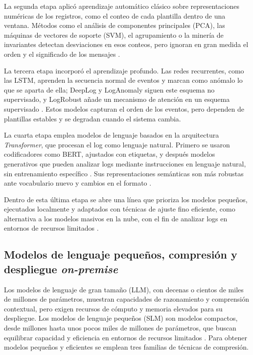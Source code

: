 La segunda etapa aplicó aprendizaje automático clásico sobre representaciones numéricas de los registros, como el conteo de cada plantilla dentro de una ventana. Métodos como el análisis de componentes principales (PCA), las máquinas de vectores de soporte (SVM), el agrupamiento o la minería de invariantes detectan desviaciones en esos conteos, pero ignoran en gran medida el orden y el significado de los mensajes \cite{he2021_survey}.

La tercera etapa incorporó el aprendizaje profundo. Las redes recurrentes, como las LSTM, aprenden la secuencia normal de eventos y marcan como anómalo lo que se aparta de ella; DeepLog y LogAnomaly siguen este esquema no supervisado, y LogRobust añade un mecanismo de atención en un esquema supervisado \cite{jiang2021_aiops}. Estos modelos capturan el orden de los eventos, pero dependen de plantillas estables y se degradan cuando el sistema cambia.

La cuarta etapa emplea modelos de lenguaje basados en la arquitectura \textit{Transformer}, que procesan el log como lenguaje natural. Primero se usaron codificadores como BERT, ajustados con etiquetas, y después modelos generativos que pueden analizar logs mediante instrucciones en lenguaje natural, sin entrenamiento específico \cite{liu2024_logprompt}. Sus representaciones semánticas son más robustas ante vocabulario nuevo y cambios en el formato \cite{murphy2024_embeddings}.

Dentro de esta última etapa se abre una línea que prioriza los modelos pequeños, ejecutados localmente y adaptados con técnicas de ajuste fino eficiente, como alternativa a los modelos masivos en la nube, con el fin de analizar logs en entornos de recursos limitados \cite{saha2025_slm_minimal}.

\subsection{Modelos de lenguaje pequeños, compresión y despliegue \textit{on-premise}}\label{sec:mt_slm}

Los modelos de lenguaje de gran tamaño (LLM), con decenas o cientos de miles de millones de parámetros, muestran capacidades de razonamiento y comprensión contextual, pero exigen recursos de cómputo y memoria elevados para su despliegue. Los modelos de lenguaje pequeños (SLM) son modelos compactos, desde millones hasta unos pocos miles de millones de parámetros, que buscan equilibrar capacidad y eficiencia en entornos de recursos limitados \cite{wang2025_slm_survey}. Para obtener modelos pequeños y eficientes se emplean tres familias de técnicas de compresión.

